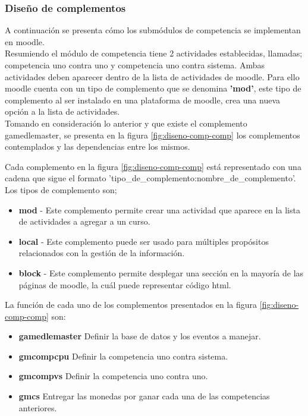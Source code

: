 

\subsubsection{Diseño de complementos}



A continuación se presenta cómo los submódulos de competencia
se implementan en moodle.\\


\noindent Resumiendo el módulo de competencia tiene 2 actividades establecidas, llamadas;
competencia uno contra uno y competencia uno contra sistema.
Ambas actividades deben aparecer dentro de la lista de actividades de moodle. Para ello
moodle cuenta con un tipo de complemento que se denomina \textbf{'mod'}, este tipo de complemento al ser instalado
en una plataforma de moodle, crea una nueva opción a la lista de actividades.\\

\noindent Tomando en consideración lo anterior y que existe el complemento gamedlemaster, se presenta en la figura \ref{fig:diseno-comp-comp}
los complementos contemplados y las dependencias entre los mismos.




Cada complemento en la figura \ref{fig:diseno-comp-comp} está representado con una cadena que sigue el formato 'tipo\_de\_complemento:nombre\_de\_complemento'. Los tipos de complemento son;
\begin{itemize}
    \item \textbf{mod} - Este complemento permite crear una actividad que aparece en la lista de actividades a agregar a un curso.
    \item \textbf{local} -  Este complemento puede ser usado para múltiples propósitos relacionados con la gestión de la información.
    \item \textbf{block} - Este complemento permite desplegar una sección en la mayoría de las páginas de moodle, la cuál puede representar código html.
\end{itemize}

La función de cada uno de los complementos presentados en la figura \ref{fig:diseno-comp-comp} son:


\begin{itemize}
    \item \textbf{gamedlemaster} Definir la base de datos y los eventos a manejar.
    \item \textbf{gmcompcpu} Definir la competencia uno contra sistema.
    \item \textbf{gmcompvs} Definir la competencia uno contra uno.
    \item \textbf{gmcs} Entregar las monedas por ganar cada una de las competencias anteriores.
\end{itemize}

